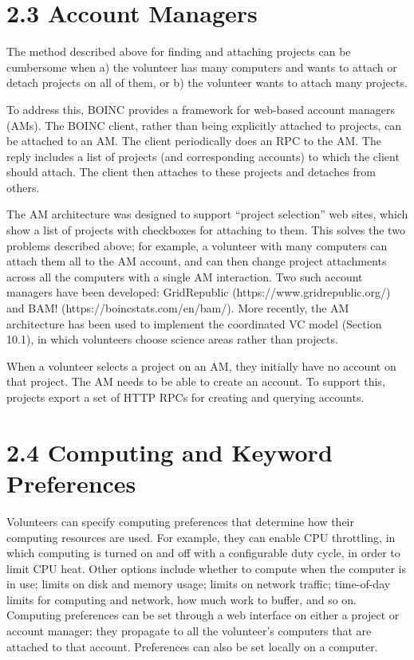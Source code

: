 \documentclass[
]{article}
\begin{document}
\section{2.3 Account Managers}\label{account-managers}

The method described above for finding and attaching projects can be
cumbersome when a) the volunteer has many computers and wants to attach
or detach projects on all of them, or b) the volunteer wants to attach
many projects.

To address this, BOINC provides a framework for web-based account
managers (AMs). The BOINC client, rather than being explicitly attached
to projects, can be attached to an AM. The client periodically does an
RPC to the AM. The reply includes a list of projects (and corresponding
accounts) to which the client should attach. The client then attaches to
these projects and detaches from others.

The AM architecture was designed to support ``project selection'' web
sites, which show a list of projects with checkboxes for attaching to
them. This solves the two problems described above; for example, a
volunteer with many computers can attach them all to the AM account, and
can then change project attachments across all the computers with a
single AM interaction. Two such account managers have been developed:
GridRepublic (https://www.gridrepublic.org/) and BAM!
(https://boincstats.com/en/bam/). More recently, the AM architecture has
been used to implement the coordinated VC model (Section 10.1), in which
volunteers choose science areas rather than projects.

When a volunteer selects a project on an AM, they initially have no
account on that project. The AM needs to be able to create an account.
To support this, projects export a set of HTTP RPCs for creating and
querying accounts.

\section{2.4 Computing and Keyword
Preferences}\label{computing-and-keyword-preferences}

Volunteers can specify computing preferences that determine how their
computing resources are used. For example, they can enable CPU
throttling, in which computing is turned on and off with a configurable
duty cycle, in order to limit CPU heat. Other options include whether to
compute when the computer is in use; limits on disk and memory usage;
limits on network traffic; time-of-day limits for computing and network,
how much work to buffer, and so on. Computing preferences can be set
through a web interface on either a project or account manager; they
propagate to all the volunteer's computers that are attached to that
account. Preferences can also be set locally on a computer.
\end{document}
